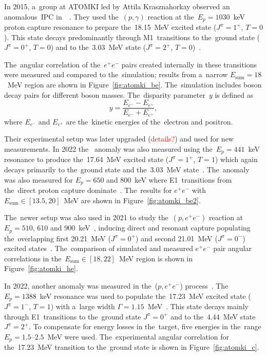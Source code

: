 			In 2015, a~group at ATOMKI led by Attila Krasznahorkay observed an anomalous~\ac{IPC} in~~\cite{atomki_be}. They used the~$(p,\gamma)$ reaction at the~$E_p = 1030$~keV proton capture resonance to prepare the~18.15~MeV excited state ($J^\pi = 1^{+}$, $T=0$). This state decays predominantly through M1~transitions to the~ground state ($J^\pi = 0^{+}$, $T=0$) and to the~3.03~MeV state ($J^\pi = 2^{+}$, $T=0$)~\cite{resonances}.
			
			The~angular correlation of the~$e^+ e^-$ pairs created internally in these transitions were measured and compared to the~simulation; results from a~narrow $E_\text{sum}=18$~MeV region are shown in Figure~\ref{fig:atomki_be}. The~simulation includes boson decay pairs for different boson masses. The~disparity parameter~$y$ is defined as
				\begin{equation}
					y = \frac{E_{e^-}-E_{e^+}}{E_{e^-}+E_{e^+}},
					\label{eq:dispar}
				\end{equation}
			where $E_{e^-}$ and $E_{e^+}$ are the~kinetic energies of the~electron and positron.
			
			Their experimental setup was later upgraded (\textcolor{red}{details?}) and used for new measurements. In 2022 the~ anomaly was also measured using the~$E_p = 441$~keV resonance to produce the~17.64~MeV excited state ($J^\pi = 1^{+}$, $T=1$) which again decays primarily to the~ground state and the~3.03~MeV state~\cite{resonances}. The~anomaly was also measured for $E_p = 650$ and 800~keV where E1~transitions from the~direct proton capture dominate~\cite{atomki_be2}. The~results for $e^+e^-$ with ${E_\text{sum}\in[13.5,20]}$~MeV are shown in Figure~\ref{fig:atomki_be2}.
			
			The~newer setup was also used in 2021 to study the~$(p,e^+ e^-)$ reaction at $E_p = 510$, 610 and 900~keV~\cite{atomki_he2}, inducing direct and resonant capture populating the~overlapping first 20.21~MeV ($J^\pi = 0^+$) and second 21.01~MeV ($J^\pi = 0^-$) excited states~\cite{resonances2}. The~comparison of simulated and measured $e^+e^-$ pair angular correlations in the~${E_\text{sum}\in[18,22]}$~MeV region is shown in Figure~\ref{fig:atomki_he}.
			
			In 2022, another anomaly was measured in the~($p,e^+e^-$) process~\cite{atomki_c}. The~$E_p = 1388$~keV resonance was used to populate the~17.23~MeV excited state ($J^\pi = 1^-$, $T = 1$) with a~large width $\Gamma = 1.15$~MeV~\cite{resonances3}. This state decays mainly through E1~transitions to the~ground state $J^\pi = 0^+$ and to the~4.44~MeV state $J^\pi = 2^+$. To compensate for energy losses in the~target, five energies in the~range $E_p = 1.5\text{--}2.5$~MeV were used. The~experimental angular correlation for the~17.23~MeV transition to the~ground state is shown in Figure~\ref{fig:atomki_c}.
			
